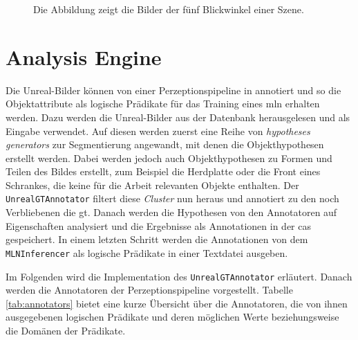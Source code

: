 \begin{figure}
\begin{subfigure}[b]{0.3\textwidth}
	\end{subfigure}
\caption[Unreal-Bilder einer Szene]{Die Abbildung zeigt die Bilder der fünf Blickwinkel einer Szene.}
\label{fig:exampleScene}
\end{figure}

\section{Analysis Engine}
\label{sec:analysisengine}
Die Unreal-Bilder können  von einer Perzeptionspipeline in \robosherlock annotiert und so die Objektattribute als logische Prädikate für das Training eines \gls{mln} erhalten werden. Dazu werden die Unreal-Bilder aus der Datenbank herausgelesen und als Eingabe verwendet. Auf diesen werden zuerst eine Reihe von \textit{hypotheses generators} zur Segmentierung angewandt, mit denen die Objekthypothesen erstellt werden. Dabei werden jedoch auch Objekthypothesen zu Formen und Teilen des Bildes erstellt, zum Beispiel die Herdplatte oder die Front eines Schrankes, die keine für die Arbeit relevanten Objekte enthalten. Der \texttt{UnrealGTAnnotator} filtert diese \textit{Cluster} nun heraus und annotiert zu den noch Verbliebenen die \gls{gt}. Danach werden die Hypothesen von den Annotatoren auf Eigenschaften analysiert und die Ergebnisse als Annotationen in der \gls{cas} gespeichert. In einem letzten Schritt werden die Annotationen von dem \texttt{MLNInferencer} als logische Prädikate in einer Textdatei ausgeben. \par 

Im Folgenden wird die Implementation des \texttt{UnrealGTAnnotator} erläutert. Danach werden die Annotatoren der Perzeptionspipeline vorgestellt. Tabelle \ref{tab:annotators} bietet eine kurze Übersicht über die Annotatoren, die von ihnen ausgegebenen logischen Prädikate und deren möglichen Werte beziehungsweise die Domänen der Prädikate.

